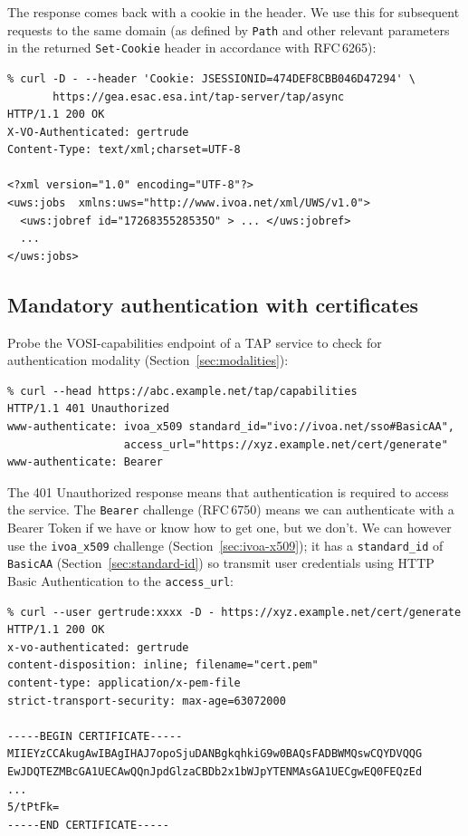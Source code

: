 \documentclass[11pt,a4paper]{ivoa}
\newcommand{\rfc}[1]{RFC\,#1}
\newcommand{\header}[1]{{\tt #1}}
\begin{document}
\noindent
The response comes back with a cookie in the header.
We use this for subsequent requests to the same domain
(as defined by {\tt Path} and other relevant parameters in the
returned \header{Set-Cookie} header in accordance with \rfc{6265}):
{\footnotesize
\begin{verbatim}
% curl -D - --header 'Cookie: JSESSIONID=474DEF8CBB046D47294' \
       https://gea.esac.esa.int/tap-server/tap/async
HTTP/1.1 200 OK
X-VO-Authenticated: gertrude
Content-Type: text/xml;charset=UTF-8

<?xml version="1.0" encoding="UTF-8"?>
<uws:jobs  xmlns:uws="http://www.ivoa.net/xml/UWS/v1.0">
  <uws:jobref id="1726835528535O" > ... </uws:jobref>
  ...
</uws:jobs>
\end{verbatim}
}

\subsection{Mandatory authentication with certificates}
\label{sec:x509-example}


Probe the VOSI-capabilities endpoint of a TAP service to check
for authentication modality (Section~\ref{sec:modalities}):
{\footnotesize
\begin{verbatim}
% curl --head https://abc.example.net/tap/capabilities
HTTP/1.1 401 Unauthorized
www-authenticate: ivoa_x509 standard_id="ivo://ivoa.net/sso#BasicAA",
                  access_url="https://xyz.example.net/cert/generate"
www-authenticate: Bearer
\end{verbatim}
}

\noindent
The 401 Unauthorized response means that authentication
is required to access the service.
The \verb|Bearer| challenge (\rfc{6750}) means we can authenticate with
a Bearer Token if we have or know how to get one, but we don't.
We can however use the \verb|ivoa_x509| challenge
(Section~\ref{sec:ivoa-x509});
it has a \verb|standard_id| of \verb|BasicAA| (Section~\ref{sec:standard-id})
so transmit user credentials using
HTTP Basic Authentication to the \verb|access_url|:

{\footnotesize
\begin{verbatim}
% curl --user gertrude:xxxx -D - https://xyz.example.net/cert/generate
HTTP/1.1 200 OK
x-vo-authenticated: gertrude
content-disposition: inline; filename="cert.pem"
content-type: application/x-pem-file
strict-transport-security: max-age=63072000

-----BEGIN CERTIFICATE-----
MIIEYzCCAkugAwIBAgIHAJ7opoSjuDANBgkqhkiG9w0BAQsFADBWMQswCQYDVQQG
EwJDQTEZMBcGA1UECAwQQnJpdGlzaCBDb2x1bWJpYTENMAsGA1UECgwEQ0FEQzEd
...
5/tPtFk=
-----END CERTIFICATE-----
\end{verbatim}
}
\end{document}
